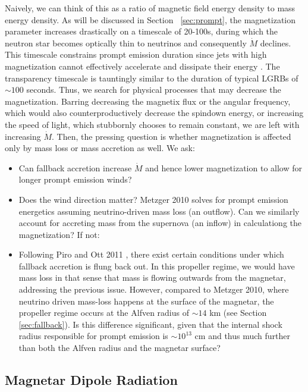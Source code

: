 \documentclass{article}
\begin{document}
Naively, we can think of this as a ratio of magnetic field energy density to mass energy density. As will be discussed in Section ~\ref{sec:prompt}, the magnetization parameter increases drastically on a timescale of 20-100s, during which the neutron star becomes optically thin to neutrinos and consequently $\dot{M}$ declines. This timescale constrains prompt emission duration since jets with high magnetization cannot effectively accelerate and dissipate their energy \cite{Metzger:2010pp}. The transparency timescale is tauntingly similar to the duration of typical LGRBs of $\sim 100$ seconds. Thus, we search for physical processes that may decrease the magnetization. Barring decreasing the magnetix flux or the angular frequency, which would also counterproductively decrease the spindown energy, or increasing the speed of light, which stubbornly chooses to remain constant,  we are left with increasing $\dot{M}$. Then, the pressing question is whether magnetization is affected only by mass loss or mass accretion as well. We ask:

\begin{itemize}
\item Can fallback accretion increase $\dot{M}$ and hence lower magnetization to allow for longer prompt emission winds?
\item Does the wind direction matter? Metzger 2010 \cite {Metzger:2010pp} solves for prompt emission energetics assuming neutrino-driven mass loss (an outflow). Can we similarly account for accreting mass from the supernova (an inflow) in calculationg the magnetization? If not:
\item Following Piro and Ott 2011 \cite {Piro:2011ed}, there exist certain conditions under which fallback accretion is flung back out. In this propeller regime, we would have mass loss in that sense that mass is flowing outwards from the magnetar, addressing the previous issue. However, compared to Metzger 2010, where neutrino driven mass-loss happens at the surface of the magnetar, the propeller regime occurs at the Alfven radius of $\sim 14$ km (see Section \ref{sec:fallback}). Is this difference significant, given that the internal shock radius responsible for prompt emission is $\sim 10^{13}$ cm and thus much further than both the Alfven radius and the magnetar surface?
\end{itemize}

\subsection{Magnetar Dipole Radiation} \label{sec:dipole}
\end{document}
